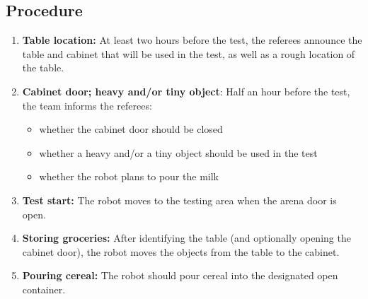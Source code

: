 \subsection*{Procedure}
\begin{enumerate}[nosep]
	\item \textbf{Table location:} At least two hours before the test, the referees announce the table and cabinet that will be used in the test, as well as a rough location of the table.
	\item \textbf{Cabinet door; heavy and/or tiny object}: Half an hour before the test, the team informs the referees:
		\begin{itemize}
			\item whether the cabinet door should be closed
			\item whether a heavy and/or a tiny object should be used in the test
			\item whether the robot plans to pour the milk
		\end{itemize}
	\item \textbf{Test start:} The robot moves to the testing area when the arena door is open.
	\item \textbf{Storing groceries:} After identifying the table (and optionally opening the cabinet door), the robot moves the objects from the table to the cabinet.
	\item \textbf{Pouring cereal:} The robot should pour cereal into the designated open container.
\end{enumerate}


